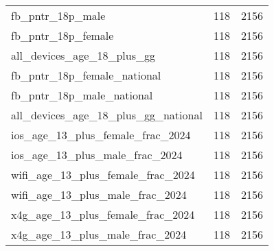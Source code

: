 \begin{table}[ht]
\begin{tabular}{lrr}
  fb\_pntr\_18p\_male & 118 & 2156 \\ 
  fb\_pntr\_18p\_female & 118 & 2156 \\ 
  all\_devices\_age\_18\_plus\_gg & 118 & 2156 \\ 
  fb\_pntr\_18p\_female\_national & 118 & 2156 \\ 
  fb\_pntr\_18p\_male\_national & 118 & 2156 \\ 
  all\_devices\_age\_18\_plus\_gg\_national & 118 & 2156 \\ 
  ios\_age\_13\_plus\_female\_frac\_2024 & 118 & 2156 \\ 
  ios\_age\_13\_plus\_male\_frac\_2024 & 118 & 2156 \\ 
  wifi\_age\_13\_plus\_female\_frac\_2024 & 118 & 2156 \\ 
  wifi\_age\_13\_plus\_male\_frac\_2024 & 118 & 2156 \\ 
  x4g\_age\_13\_plus\_female\_frac\_2024 & 118 & 2156 \\ 
  x4g\_age\_13\_plus\_male\_frac\_2024 & 118 & 2156 \\ 
   \hline
\end{tabular}
\end{table}
